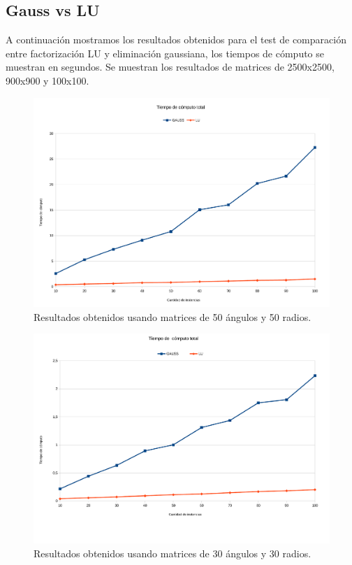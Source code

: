 \subsection{Gauss vs LU}
A continuación mostramos los resultados obtenidos para el test de comparación entre factorización LU y eliminación gaussiana, los tiempos de cómputo se muestran en segundos. Se muestran los resultados de matrices de 2500x2500, 900x900 y 100x100. 


\begin{figure}[H]{}
\centering
\includegraphics[scale=0.5]{graphs/gaussVsLU1.pdf}
\caption{Resultados obtenidos usando matrices de 50 ángulos y 50 radios.}
\label{gaussVsLU1}
\end{figure}

\begin{figure}[H]{}
\centering
\includegraphics[scale=0.5]{graphs/gaussVsLU2.pdf}
\caption{Resultados obtenidos usando matrices de 30 ángulos y 30 radios.}
\label{gaussVsLU2}
\end{figure}


